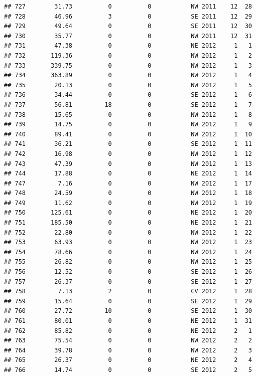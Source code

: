 \documentclass[
]{article}
\begin{document}
\begin{verbatim}
## 727        31.73          0          0           NW 2011    12  28
## 728        46.96          3          0           SE 2011    12  29
## 729        49.64          0          0           SE 2011    12  30
## 730        35.77          0          0           NW 2011    12  31
## 731        47.38          0          0           NE 2012     1   1
## 732       119.36          0          0           NW 2012     1   2
## 733       339.75          0          0           NW 2012     1   3
## 734       363.89          0          0           NW 2012     1   4
## 735        20.13          0          0           NW 2012     1   5
## 736        34.44          0          0           SE 2012     1   6
## 737        56.81         18          0           SE 2012     1   7
## 738        15.65          0          0           NW 2012     1   8
## 739        14.75          0          0           NW 2012     1   9
## 740        89.41          0          0           NW 2012     1  10
## 741        36.21          0          0           SE 2012     1  11
## 742        16.98          0          0           NW 2012     1  12
## 743        47.39          0          0           NW 2012     1  13
## 744        17.88          0          0           NE 2012     1  14
## 747         7.16          0          0           NW 2012     1  17
## 748        24.59          0          0           NW 2012     1  18
## 749        11.62          0          0           NW 2012     1  19
## 750       125.61          0          0           NE 2012     1  20
## 751       185.50          0          0           NE 2012     1  21
## 752        22.80          0          0           NW 2012     1  22
## 753        63.93          0          0           NW 2012     1  23
## 754        78.66          0          0           NW 2012     1  24
## 755        26.82          0          0           NW 2012     1  25
## 756        12.52          0          0           SE 2012     1  26
## 757        26.37          0          0           SE 2012     1  27
## 758         7.13          2          0           CV 2012     1  28
## 759        15.64          0          0           SE 2012     1  29
## 760        27.72         10          0           SE 2012     1  30
## 761        80.01          0          0           NE 2012     1  31
## 762        85.82          0          0           NE 2012     2   1
## 763        75.54          0          0           NW 2012     2   2
## 764        39.78          0          0           NW 2012     2   3
## 765        26.37          0          0           NE 2012     2   4
## 766        14.74          0          0           SE 2012     2   5

\end{verbatim}
\end{document}
